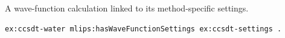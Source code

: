 A wave-function calculation linked to its method-specific settings.
\begin{lstlisting}[language=turtle]
ex:ccsdt-water mlips:hasWaveFunctionSettings ex:ccsdt-settings .
\end{lstlisting}
